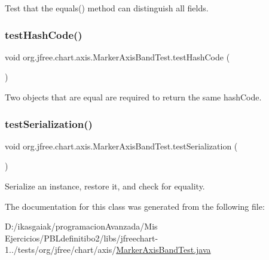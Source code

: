 Test that the equals() method can distinguish all fields. \mbox{\label{classorg_1_1jfree_1_1chart_1_1axis_1_1_marker_axis_band_test_a3a7035f7a3f4e36659e40556509ee21e}} 
\subsubsection{\texorpdfstring{test\+Hash\+Code()}{testHashCode()}}
{\footnotesize\ttfamily void org.\+jfree.\+chart.\+axis.\+Marker\+Axis\+Band\+Test.\+test\+Hash\+Code (\begin{DoxyParamCaption}{ }\end{DoxyParamCaption})}

Two objects that are equal are required to return the same hash\+Code. \mbox{\label{classorg_1_1jfree_1_1chart_1_1axis_1_1_marker_axis_band_test_a42292fb52946ec5812f81ce3c4140fa0}} 
\subsubsection{\texorpdfstring{test\+Serialization()}{testSerialization()}}
{\footnotesize\ttfamily void org.\+jfree.\+chart.\+axis.\+Marker\+Axis\+Band\+Test.\+test\+Serialization (\begin{DoxyParamCaption}{ }\end{DoxyParamCaption})}

Serialize an instance, restore it, and check for equality. 

The documentation for this class was generated from the following file\+:\begin{DoxyCompactItemize}
\item 
D\+:/ikasgaiak/programacion\+Avanzada/\+Mis Ejercicios/\+P\+B\+Ldefinitibo2/libs/jfreechart-\/1../tests/org/jfree/chart/axis/\mbox{\hyperlink{_marker_axis_band_test_8java}{Marker\+Axis\+Band\+Test.\+java}}\end{DoxyCompactItemize}
